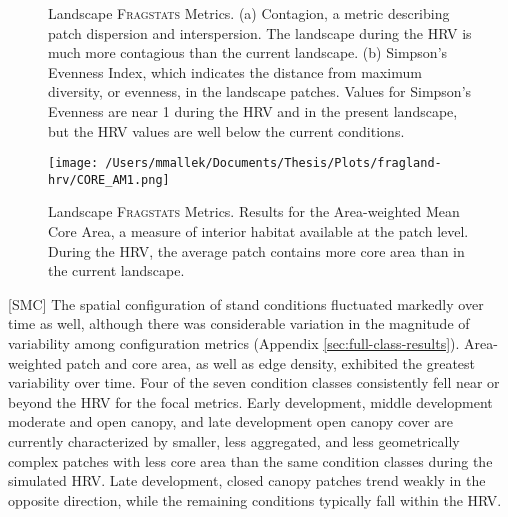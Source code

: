 \begin{figure}[!htbp]
  \centering
\caption{Landscape \textsc{Fragstats} Metrics. (a) Contagion, a metric describing patch dispersion and interspersion. The landscape during the HRV is much more contagious than the current landscape. (b) Simpson's Evenness Index, which indicates the distance from maximum diversity, or evenness, in the landscape patches. Values for Simpson's Evenness are near 1 during the HRV and in the present landscape, but the HRV values are well below the current conditions.} 
\label{fig:fragland_contagsiei}
\end{figure}

\begin{figure}[!htbp]
  \centering
  \texttt{[image: /Users/mmallek/Documents/Thesis/Plots/fragland-hrv/CORE\_AM1.png]}
\caption{Landscape \textsc{Fragstats} Metrics. Results for the Area-weighted Mean Core Area, a measure of interior habitat available at the patch level. During the HRV, the average patch contains more core area than in the current landscape.} 
\label{fig:fragland_core}
\end{figure}


[SMC] The spatial configuration of stand conditions fluctuated markedly over time as well, although there was considerable variation in the magnitude of variability among configuration metrics (Appendix \ref{sec:full-class-results}). Area-weighted patch and core area, as well as edge density, exhibited the greatest variability over time. Four of the seven condition classes consistently fell near or beyond the HRV for the focal metrics. Early development, middle development moderate and open canopy, and late development open canopy cover are currently characterized by smaller, less aggregated, and less geometrically complex patches with less core area than the same condition classes during the simulated HRV. Late development, closed canopy patches trend weakly in the opposite direction, while the remaining conditions typically fall within the HRV.